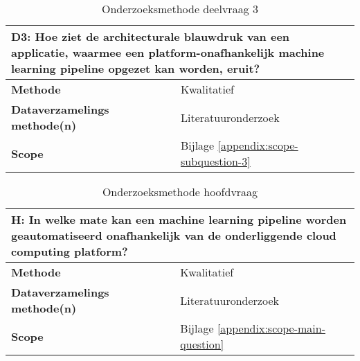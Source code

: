 \begin{table}[hbt!]
  \centering
  \begin{tabular}{|p{.215\linewidth}|p{.72\linewidth}|}
  \hline
  \multicolumn{2}{|p{.97\linewidth}|}{\textbf{D3: Hoe ziet de architecturale blauwdruk van een applicatie, waarmee een platform-onafhankelijk machine learning pipeline opgezet kan worden, eruit?}} \\ \hline
    \textbf{Methode}&
      Kwalitatief
    \\ \hline
    \textbf{Dataverzamelings methode(n)}&
      Literatuuronderzoek
    \\ \hline
    \textbf{Scope}&
      Bijlage \ref{appendix:scope-subquestion-3}
    \\ \hline
  \end{tabular}
  \caption{Onderzoeksmethode deelvraag 3}
  \label{table:sq3}
\end{table}

\space
\newpage

\begin{table}[hbt!]
  \centering
  \begin{tabular}{|p{.215\linewidth}|p{.72\linewidth}|}
  \hline
  \multicolumn{2}{|p{.97\linewidth}|}{\textbf{H: In welke mate kan een machine learning pipeline worden geautomatiseerd onafhankelijk van de onderliggende cloud computing platform?}} \\ \hline
    \textbf{Methode}&
      Kwalitatief
    \\ \hline
    \textbf{Dataverzamelings methode(n)}&
      Literatuuronderzoek
    \\ \hline
    \textbf{Scope}&
      Bijlage \ref{appendix:scope-main-question}
    \\ \hline
  \end{tabular}
  \caption{Onderzoeksmethode hoofdvraag}
  \label{table:mq}
\end{table}